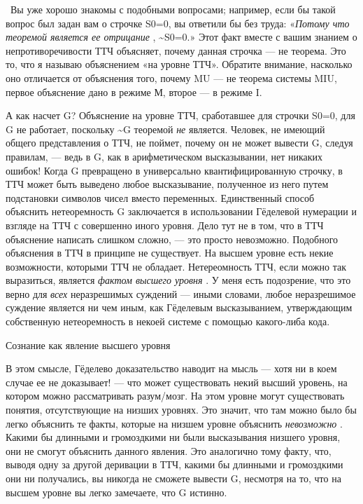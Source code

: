 ~Вы уже хорошо знакомы с подобными вопросами; например, если бы такой вопрос был задан вам о строчке S0=0, вы ответили бы без труда: «\emph{Потому что теоремой является ее отрицание} , \textasciitilde S0=0.» Этот факт вместе с вашим знанием о непротиворечивости ТТЧ объясняет, почему данная строчка --- не теорема. Это то, что я называю объяснением «на уровне ТТЧ». Обратите внимание, насколько оно отличается от объяснения того, почему MU --- не теорема системы MIU, первое объяснение дано в режиме М, второе --- в режиме I.

А как насчет G? Объяснение на уровне ТТЧ, сработавшее для строчки S0=0, для G не работает, поскольку \textasciitilde G теоремой \emph{не} является. Человек, не имеющий общего представления о ТТЧ, не поймет, почему он не может вывести G, следуя правилам, --- ведь в G, как в арифметическом высказывании, нет никаких ошибок! Когда G превращено в универсально квантифицированную строчку, в ТТЧ может быть выведено любое высказывание, полученное из него путем подстановки символов чисел вместо переменных. Единственный способ объяснить нетеоремность G заключается в использовании Гёделевой нумерации и взгляде на ТТЧ с совершенно иного уровня. Дело тут не в том, что в ТТЧ объяснение написать слишком сложно, --- это просто невозможно. Подобного объяснения в ТТЧ в принципе не существует. На высшем уровне есть некие возможности, которыми ТТЧ не обладает. Нетереомность ТТЧ, если можно так выразиться, является \emph{фактом высшего уровня} . У меня есть подозрение, что это верно для \emph{всех} неразрешимых суждений --- иными словами, любое неразрешимое суждение является ни чем иным, как Гёделевым высказыванием, утверждающим собственную нетеоремность в некоей системе с помощью какого-либа кода.

Сознание как явление высшего уровня

В этом смысле, Гёделево доказательство наводит на мысль --- хотя ни в коем случае ее не доказывает! --- что может существовать некий высший уровень, на котором можно рассматривать разум/мозг. На этом уровне могут существовать понятия, отсутствующие на низших уровнях. Это значит, что там можно было бы легко объяснить те факты, которые на низшем уровне объяснить \emph{невозможно} . Какими бы длинными и громоздкими ни были высказывания низшего уровня, они не смогут объяснить данного явления. Это аналогично тому факту, что, выводя одну за другой деривации в ТТЧ, какими бы длинными и громоздкими они ни получались, вы никогда не сможете вывести G, несмотря на то, что на высшем уровне вы легко замечаете, что G истинно.

